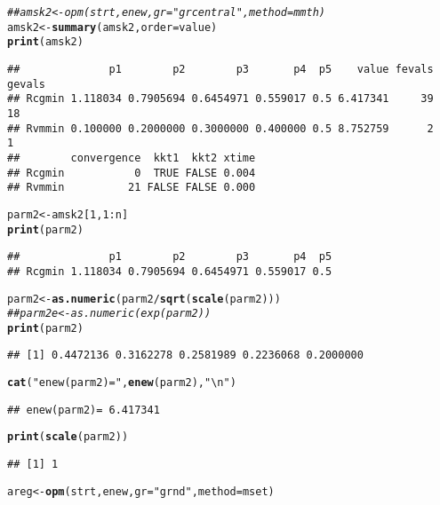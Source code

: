 \documentclass[11pt]{article}\usepackage[]{graphicx}\usepackage[]{color}
\makeatletter
\newcommand{\hlnum}[1]{\textcolor[rgb]{0.686,0.059,0.569}{#1}}%
\newcommand{\hlstr}[1]{\textcolor[rgb]{0.192,0.494,0.8}{#1}}%
\newcommand{\hlcom}[1]{\textcolor[rgb]{0.678,0.584,0.686}{\textit{#1}}}%
\newcommand{\hlopt}[1]{\textcolor[rgb]{0,0,0}{#1}}%
\newcommand{\hlstd}[1]{\textcolor[rgb]{0.345,0.345,0.345}{#1}}%
\newcommand{\hlkwb}[1]{\textcolor[rgb]{0.69,0.353,0.396}{#1}}%
\newcommand{\hlkwc}[1]{\textcolor[rgb]{0.333,0.667,0.333}{#1}}%
\newcommand{\hlkwd}[1]{\textcolor[rgb]{0.737,0.353,0.396}{\textbf{#1}}}%
\newenvironment{kframe}{%
 \def\at@end@of@kframe{}%
 \ifinner\ifhmode%
  \def\at@end@of@kframe{\end{minipage}}%
  \begin{minipage}{\columnwidth}%
 \fi\fi%
 \def\FrameCommand##1{\hskip\@totalleftmargin \hskip-\fboxsep
 \colorbox{shadecolor}{##1}\hskip-\fboxsep
     \hskip-\linewidth \hskip-\@totalleftmargin \hskip\columnwidth}%
 \MakeFramed {\advance\hsize-\width
   \@totalleftmargin\z@ \linewidth\hsize
   \@setminipage}}%
 {\par\unskip\endMakeFramed%
 \at@end@of@kframe}
\newenvironment{knitrout}{}{} %
\makeatother
\begin{document}
\begin{knitrout}
\begin{kframe}
{\ttfamily\noindent\color{warningcolor}{\#\# Warning in Rcgminb(par = spar, fn = efn, gr = egr, lower = slower, upper = supper, : Rcgmin - undefined function}}\begin{alltt}
\hlcom{## amsk2 <- opm(strt, enew, gr="grcentral", method=mmth)}
\hlstd{amsk2} \hlkwb{<-} \hlkwd{summary}\hlstd{(amsk2,} \hlkwc{order}\hlstd{=value)}
\hlkwd{print}\hlstd{(amsk2)}
\end{alltt}
\begin{verbatim}
##              p1        p2        p3       p4  p5    value fevals gevals
## Rcgmin 1.118034 0.7905694 0.6454971 0.559017 0.5 6.417341     39     18
## Rvmmin 0.100000 0.2000000 0.3000000 0.400000 0.5 8.752759      2      1
##        convergence  kkt1  kkt2 xtime
## Rcgmin           0  TRUE FALSE 0.004
## Rvmmin          21 FALSE FALSE 0.000
\end{verbatim}
\begin{alltt}
\hlstd{parm2} \hlkwb{<-} \hlstd{amsk2[}\hlnum{1}\hlstd{,} \hlnum{1}\hlopt{:}\hlstd{n]}
\hlkwd{print}\hlstd{(parm2)}
\end{alltt}
\begin{verbatim}
##              p1        p2        p3       p4  p5
## Rcgmin 1.118034 0.7905694 0.6454971 0.559017 0.5
\end{verbatim}
\begin{alltt}
\hlstd{parm2} \hlkwb{<-} \hlkwd{as.numeric}\hlstd{(parm2}\hlopt{/}\hlkwd{sqrt}\hlstd{(}\hlkwd{scale}\hlstd{(parm2)))}
\hlcom{## parm2e<-as.numeric(exp(parm2))}
\hlkwd{print}\hlstd{(parm2)}
\end{alltt}
\begin{verbatim}
## [1] 0.4472136 0.3162278 0.2581989 0.2236068 0.2000000
\end{verbatim}
\begin{alltt}
\hlkwd{cat}\hlstd{(}\hlstr{"enew(parm2)="}\hlstd{,} \hlkwd{enew}\hlstd{(parm2),}\hlstr{"\textbackslash{}n"}\hlstd{)}
\end{alltt}
\begin{verbatim}
## enew(parm2)= 6.417341
\end{verbatim}
\begin{alltt}
\hlkwd{print}\hlstd{(}\hlkwd{scale}\hlstd{(parm2))}
\end{alltt}
\begin{verbatim}
## [1] 1
\end{verbatim}
\begin{alltt}
\hlstd{areg}\hlkwb{<-} \hlkwd{opm}\hlstd{(strt, enew,} \hlkwc{gr}\hlstd{=}\hlstr{"grnd"}\hlstd{,} \hlkwc{method}\hlstd{=mset)}
\end{alltt}



\end{kframe}
\end{knitrout}
\end{document}
